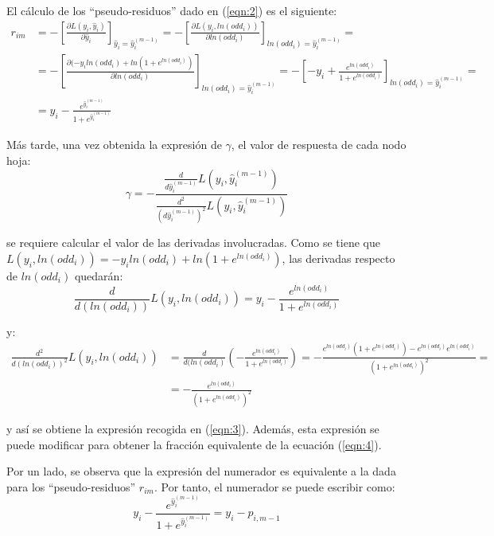 \documentclass[12pt,twoside]{article}
\begin{document}
El cálculo de los ``pseudo-residuos'' dado en (\ref{eqn:2}) es el siguiente:
\begin{equation*}
\begin{split}
r_{im} &= -\left[ \frac{\partial L(y_i, \hat{y}_i)}{\partial \hat{y}_i} \right]_{\hat{y}_i=\hat{y}_i^{(m-1)}} = - \left[ \frac{\partial L(y_i, ln(odd_i))}{\partial ln(odd_i)} \right]_{ln(odd_i)=\hat{y}_i^{(m-1)}} = \\
& = - \left[ \frac{\partial (-y_iln(odd_i) + ln(1+e^{ln(odd_i)})}{\partial ln(odd_i)} \right]_{ln(odd_i)=\hat{y}_i^{(m-1)}} = - \left[ - y_i + \frac{e^{ln(odd_i)}}{1 + e^{ln(odd_i)}} \right]_{ln(odd_i) = \hat{y}_i^{(m-1)}} =  \\
& = y_i - \frac{e^{\hat{y}_i^{(m-1)}}}{1 + e^{\hat{y}_i^{(m-1)}}}
\end{split}
\end{equation*}

Más tarde, una vez obtenida la expresión de $\gamma$, el valor de respuesta de cada nodo hoja:
\begin{equation*}
\gamma = - \frac{\frac{d}{d\hat{y}_i^{(m-1)}}L(y_i, \hat{y}_i^{(m-1)})}{\frac{d^2}{(d\hat{y}_i^{(m-1)})^2}L(y_i, \hat{y}_i^{(m-1)})}
\end{equation*}

\noindent
se requiere calcular el valor de las derivadas involucradas. Como se tiene que $L(y_i, ln(odd_i)) = -y_iln(odd_i) + ln(1 + e^{ln(odd_i)})$, las derivadas respecto de $ln(odd_i)$ quedarán:
\begin{equation*}
\frac{d}{d(ln(odd_i))}L(y_i, ln(odd_i)) = y_i - \frac{e^{ln(odd_i)}}{1 + e^{ln(odd_i)}}
\end{equation*}

\noindent
y:
\begin{equation*}
\begin{split}
\frac{d^2}{d(ln(odd_i))^2}L(y_i, ln(odd_i)) &=\frac{d}{d(ln(odd_i)} \left( - \frac{e^{ln(odd_i)}}{1 + e^{ln(odd_i)}} \right) = - \frac{e^{ln(odd_i)}(1 + e^{ln(odd_i)}) - e^{ln(odd_i)}e^{ln(odd_i)}}{(1 + e^{ln(odd_i)})^2} = \\
&= - \frac{e^{ln(odd_i)}}{(1 + e^{ln(odd_i)})^2}
\end{split}
\end{equation*}

\noindent
y así se obtiene la expresión recogida en (\ref{eqn:3}). Además, esta expresión se puede modificar para obtener la fracción equivalente de la ecuación (\ref{eqn:4}).

Por un lado, se observa que la expresión del numerador es equivalente a la dada para los ``pseudo-residuos'' $r_{im}$. Por tanto, el numerador se puede escribir como:
\begin{equation*}
y_i - \frac{e^{\hat{y}_i^{(m-1)}}}{1 + e^{\hat{y}_i^{(m-1)}}} = y_i - p_{i, m-1}
\end{equation*}
\end{document}
